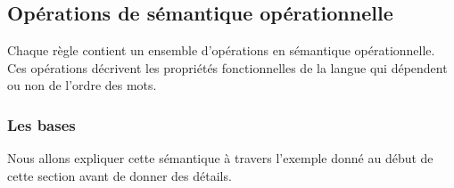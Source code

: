 \documentclass[11pt]{article}
\begin{document}
\subsection{Opérations de sémantique opérationnelle}

Chaque règle contient un ensemble d'opérations en sémantique
opérationnelle. Ces opérations décrivent les propriétés fonctionnelles
de la langue qui dépendent ou non de l'ordre des mots.

\subsubsection*{Les bases}

Nous allons expliquer cette sémantique à travers l'exemple donné au
début de cette section avant de donner des détails.
\end{document}
